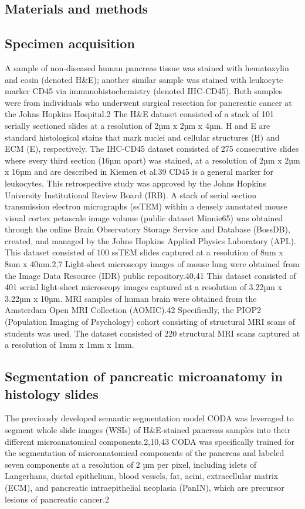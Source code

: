 \begin{refsection}
    \section{Materials and methods}
    \subsection{Specimen acquisition}
    A sample of non-diseased human pancreas tissue was stained with hematoxylin and eosin (denoted H\&E); another similar sample was stained with leukocyte marker CD45 via immunohistochemistry (denoted IHC-CD45). Both samples were from individuals who underwent surgical resection for pancreatic cancer at the Johns Hopkins Hospital.2 The H\&E dataset consisted of a stack of 101 serially sectioned slides at a resolution of 2µm x 2µm x 4µm. H and E are standard histological stains that mark nuclei and cellular structures (H) and ECM (E), respectively. The IHC-CD45 dataset consisted of 275 consecutive slides where every third section (16µm apart) was stained, at a resolution of 2µm x 2µm x 16µm and are described in Kiemen et al.39 CD45 is a general marker for leukocytes. This retrospective study was approved by the Johns Hopkins University Institutional Review Board (IRB).
    A stack of serial section transmission electron micrographs (ssTEM) within a densely annotated mouse visual cortex petascale image volume (public dataset Minnie65) was obtained through the online Brain Observatory Storage Service and Database (BossDB), created, and managed by the Johns Hopkins Applied Physics Laboratory (APL). This dataset consisted of 100 ssTEM slides captured at a resolution of 8nm x 8nm x 40nm.2,7
    Light-sheet microscopy images of mouse lung were obtained from the Image Data Resource (IDR) public repository.40,41 This dataset consisted of 401 serial light-sheet microscopy images captured at a resolution of 3.22µm x 3.22µm x 10µm.
    MRI samples of human brain were obtained from the Amsterdam Open MRI Collection (AOMIC).42 Specifically, the PIOP2 (Population Imaging of Psychology) cohort consisting of structural MRI scans of students was used. The dataset consisted of 220 structural MRI scans captured at a resolution of 1mm x 1mm x 1mm. 
    
    \subsection{Segmentation of pancreatic microanatomy in histology slides}
    The previously developed semantic segmentation model CODA was leveraged to segment whole slide images (WSIs) of H\&E-stained pancreas samples into their different microanatomical components.2,10,43 CODA was specifically trained for the segmentation of microanatomical components of the pancreas and labeled seven components at a resolution of 2 µm per pixel, including islets of Langerhans, ductal epithelium, blood vessels, fat, acini, extracellular matrix (ECM), and pancreatic intraepithelial neoplasia (PanIN), which are precursor lesions of pancreatic cancer.2
    

\end{refsection}
